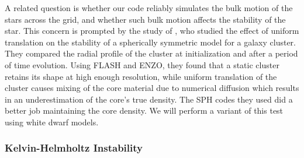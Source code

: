 \documentclass[12pt,preprint]{aastex}
\begin{document}
A related question is whether our code reliably simulates the bulk motion of the stars across the grid, and whether such bulk motion affects the stability of the star. This concern is prompted by the study of \cite{tasker:2008}, who studied the effect of uniform translation on the stability of a spherically symmetric model for a galaxy cluster. They compared the radial profile of the cluster at initialization and after a period of time evolution. Using FLASH and ENZO, they found that a static cluster retains its shape at high enough resolution, while uniform translation of the cluster causes mixing of the core material due to numerical diffusion which results in an underestimation of the core's true density. The SPH codes they used did a better job maintaining the core density. We will perform a variant of this test using white dwarf models.

\subsubsection{Kelvin-Helmholtz Instability}\label{sec:khi}
\end{document}

